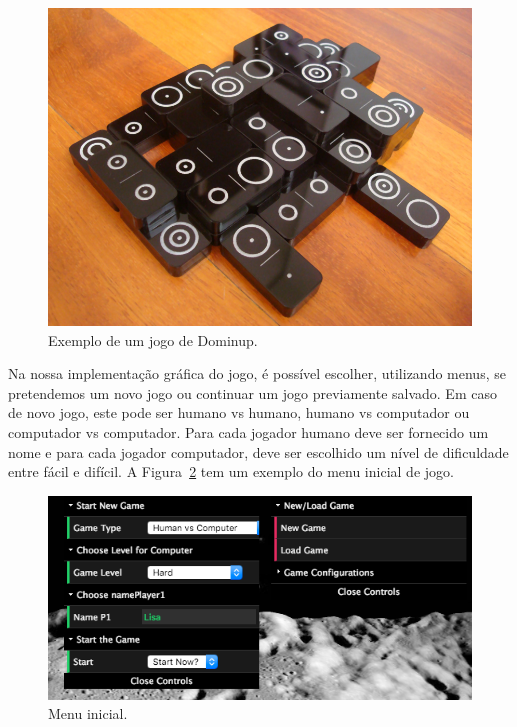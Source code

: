\documentclass[a4paper]{article}
\begin{document}
\begin{figure}[htbp]
\begin{center}
\includegraphics[scale=0.2]{example.jpg}
\caption{Exemplo de um jogo de Dominup.}
\label{example}
\end{center}
\end{figure}

Na nossa implementação gráfica do jogo, é possível escolher, utilizando menus, se pretendemos um novo jogo ou continuar um jogo previamente salvado. Em caso de novo jogo, este pode ser humano vs humano, humano vs computador ou computador vs computador. Para cada jogador humano deve ser fornecido um nome e para cada jogador computador, deve ser escolhido um nível de dificuldade entre fácil e difícil. A Figura~\ref{menu} tem um exemplo do menu inicial de jogo.

\begin{figure}[htbp]
\begin{center}
\includegraphics[scale=0.4]{menu.png}
\caption{Menu inicial.}
\label{menu}
\end{center}
\end{figure}
\end{document}
